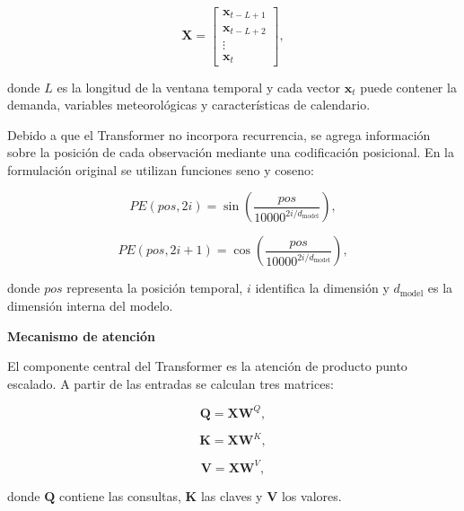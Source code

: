 \begin{equation}
    \mathbf{X}
    =
    \begin{bmatrix}
        \mathbf{x}_{t-L+1} \\
        \mathbf{x}_{t-L+2} \\
        \vdots \\
        \mathbf{x}_{t}
    \end{bmatrix},
\end{equation}

donde $L$ es la longitud de la ventana temporal y cada vector $\mathbf{x}_t$ puede contener la demanda, variables meteorológicas y características de calendario.

Debido a que el Transformer no incorpora recurrencia, se agrega información sobre la posición de cada observación mediante una codificación posicional. En la formulación original se utilizan funciones seno y coseno:

\begin{equation}
    PE(pos,2i)
    =
    \sin
    \left(
        \frac{pos}
        {10000^{2i/d_{\mathrm{model}}}}
    \right),
\end{equation}

\begin{equation}
    PE(pos,2i+1)
    =
    \cos
    \left(
        \frac{pos}
        {10000^{2i/d_{\mathrm{model}}}}
    \right),
\end{equation}

donde $pos$ representa la posición temporal, $i$ identifica la dimensión y $d_{\mathrm{model}}$ es la dimensión interna del modelo.

\textbf{Mecanismo de atención}

El componente central del Transformer es la atención de producto punto escalado. A partir de las entradas se calculan tres matrices:

\begin{equation}
    \mathbf{Q}
    =
    \mathbf{X}\mathbf{W}^{Q},
\end{equation}

\begin{equation}
    \mathbf{K}
    =
    \mathbf{X}\mathbf{W}^{K},
\end{equation}

\begin{equation}
    \mathbf{V}
    =
    \mathbf{X}\mathbf{W}^{V},
\end{equation}

donde $\mathbf{Q}$ contiene las consultas, $\mathbf{K}$ las claves y $\mathbf{V}$ los valores.

